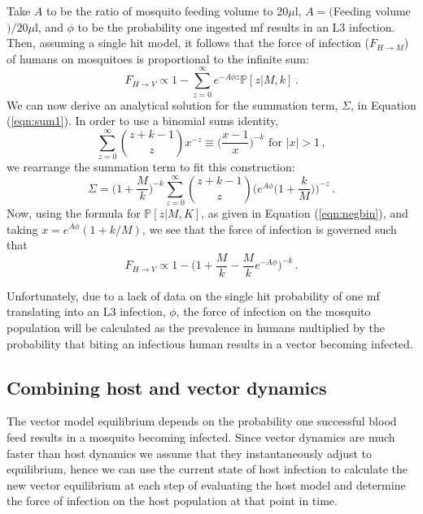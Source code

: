 \documentclass[5p,times]{elsarticle}
\begin{document}
Take $A$ to be the ratio of mosquito feeding volume to 20$\mu$l, $A=($Feeding volume$)/20\mu$l, and $\phi$ to be the probability one ingested mf results in an L3 infection. Then, assuming a single hit model, it follows that the force of infection ($F_{H\rightarrow M}$) of humans on mosquitoes is proportional to the infinite sum:
\begin{equation}
F_{H\rightarrow V} \propto 1-\sum_{z=0}^{\infty}e^{-A\phi z}\mathbb{P}[z|M,k]\,.
\label{eqn:sum1}
\end{equation} 
We can now derive an analytical solution for the summation term, $\Sigma$, in Equation (\ref{eqn:sum1}). In order to use a binomial sums identity, 
\begin{equation}
\sum_{z=0}^{\infty}\binom{z+k-1}{z}x^{-z} \equiv \Big(\frac{x-1}{x}\Big)^{-k} \mbox{ for } |x|>1\,,
\end{equation}
we rearrange the summation term to fit this construction:
\begin{equation}
\Sigma =\bigg(1+\frac{M}{k}\bigg)^{-k}\sum_{z=0}^{\infty}\binom{z+k-1}{z}\bigg(e^{A\phi}\bigg(1+\frac{k}{M}\bigg)\bigg)^{-z}\,.
\end{equation}
Now, using the formula for $\mathbb{P}[z|M,K]$, as given in Equation (\ref{eqn:negbin}), and taking $x=e^{A\phi}(1+ k/M)$, we see that the force of infection is governed such that
\begin{equation}
F_{H\rightarrow V} \propto 1 - \bigg(1+\frac{M}{k}-\frac{M}{k}e^{-A\phi}\bigg)^{-k}\,.
\end{equation}

Unfortunately, due to a lack of data on the single hit probability of one mf translating into an L3 infection, $\phi$, the force of infection on the mosquito population will be calculated as the prevalence in humans multiplied by the probability that biting an infectious human results in a vector becoming infected. 

\subsection{Combining host and vector dynamics}

The vector model equilibrium depends on the probability one successful blood feed results in a mosquito becoming infected. Since vector dynamics are much faster than host dynamics we assume that they instantaneously adjust to equilibrium, hence we can use the current state of host infection to calculate the new vector equilibrium at each step of evaluating the host model and determine the force of infection on the host population at that point in time.
\end{document}
